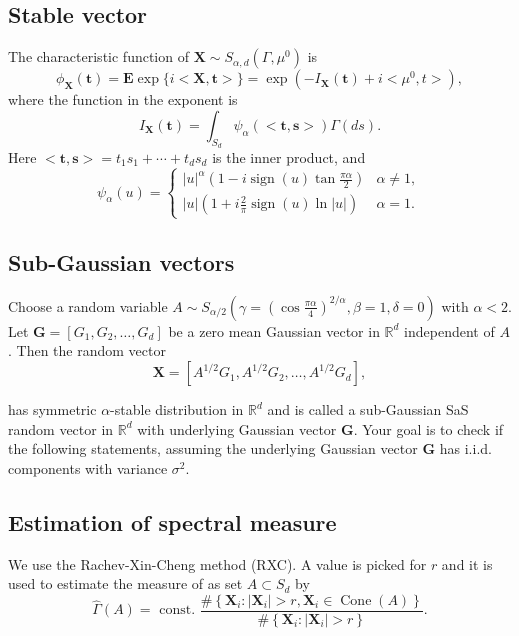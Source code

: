 \documentclass{article}
\begin{document}
	\subsection{Stable vector}
	The characteristic function of $\mathbf{X} \sim S_{\alpha, d}\left(\Gamma, \mu^0\right)$ is
	$$
	\phi_{\mathbf{X}}(\mathbf{t})=\mathbf{E} \exp \{i<\mathbf{X}, \mathbf{t}>\}=\exp \left(-I_{\mathbf{X}}(\mathbf{t})+i<\mu^0, t>\right),
	$$
	where the function in the exponent is
	$$
	I_{\mathbf{X}}(\mathbf{t})=\int_{S_d} \psi_\alpha(<\mathbf{t}, \mathbf{s}>) \Gamma(d s) .
	$$
	Here $<\mathbf{t}, \mathbf{s}>=t_1 s_1+\cdots+t_d s_d$ is the inner product, and
	$$
	\psi_\alpha(u)= \begin{cases}|u|^\alpha\left(1-i \operatorname{sign}(u) \tan \frac{\pi \alpha}{2}\right) & \alpha \neq 1, \\ 
		|u|\left(1+i \frac{2}{\pi} \operatorname{sign}(u) \ln |u|\right) & \alpha=1.\end{cases}
	$$
	
	\subsection{Sub-Gaussian vectors}\label{formula1}
	Choose a random variable $A \sim S_{\alpha / 2}\left(\gamma=\left(\cos \frac{\pi \alpha}{4}\right)^{2 / \alpha}, \beta=1, \delta=0\right)$ with $\alpha<2$. Let $\mathbf{G}=\left[G_1, G_2, \ldots, G_d\right]$ be a zero mean Gaussian vector in $\mathbb{R}^d$ independent of $A$. Then the random vector
	\begin{equation}
		\mathbf{X}=\left[A^{1 / 2} G_1, A^{1 / 2} G_2, \ldots, A^{1 / 2} G_d\right],
	\end{equation}

	has symmetric $\alpha$-stable distribution in $\mathbb{R}^d$ and is called a sub-Gaussian SaS random vector in $\mathbb{R}^d$ with underlying Gaussian vector $\mathbf{G}$.
	Your goal is to check if the following statements, assuming the underlying Gaussian vector $\mathbf{G}$ has i.i.d. components with variance $\sigma^2$.
	
	\subsection{Estimation of spectral measure}
	We use the Rachev-Xin-Cheng method (RXC). A value is picked for $r$ and it is used to estimate the measure of as set $A \subset S_d$ by
	$$
	\widehat{\Gamma}(A)=\text { const. } \frac{\#\left\{\mathbf{X}_i:\left|\mathbf{X}_i\right|>r, \mathbf{X}_i \in \operatorname{Cone}(A)\right\}}{\#\left\{\mathbf{X}_i:\left|\mathbf{X}_i\right|>r\right\}} .
	$$
	
\end{document}
